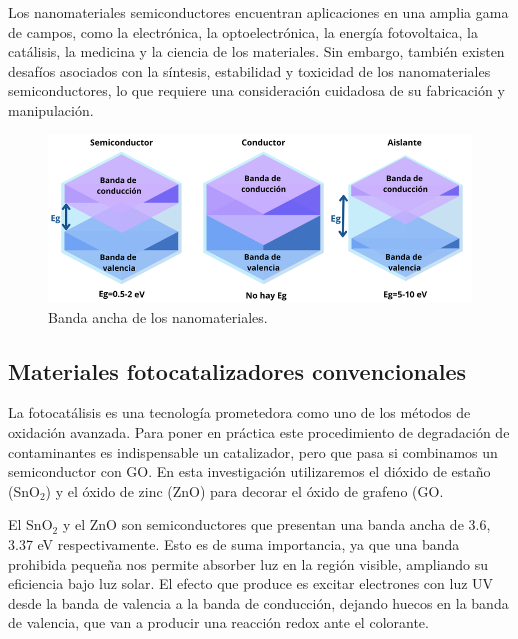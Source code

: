 \documentclass[12pt]{article}
\begin{document}
    Los nanomateriales semiconductores encuentran aplicaciones en una amplia gama de campos, como la electrónica, la optoelectrónica, la energía fotovoltaica, la catálisis, la medicina y la ciencia de los materiales. Sin embargo, también existen desafíos asociados con la síntesis, estabilidad y toxicidad de los nanomateriales semiconductores, lo que requiere una consideración cuidadosa de su fabricación y manipulación.
\begin{figure}[H]
    	   \begin{center}
     	  	\includegraphics[width = 1\textwidth]{Imagenes/SeminCondAisl.png}
     	  	\caption{Banda ancha de los nanomateriales. }\label{fig:SeminCondAisl}  
    	   \end{center} 
        \end{figure}

    \subsection{Materiales fotocatalizadores convencionales}
    La fotocatálisis es una tecnología prometedora como uno de los métodos de oxidación avanzada. Para poner en práctica este procedimiento de degradación de contaminantes es indispensable un catalizador, pero que pasa si combinamos un semiconductor con GO. En esta investigación utilizaremos el dióxido de estaño (SnO$\displaystyle _{2}$) y el óxido de zinc (ZnO) para decorar el óxido de grafeno (GO. \vspace{1em} %
    
    El SnO$\displaystyle _{2}$  y el ZnO son semiconductores que presentan una banda ancha de 3.6, 3.37 eV respectivamente. Esto es de suma importancia, ya que una banda prohibida pequeña nos permite absorber luz en la región visible, ampliando su eficiencia bajo luz solar. El efecto que produce es excitar electrones con luz UV desde la banda de valencia a la banda de conducción, dejando huecos en la banda de valencia, que van a producir una reacción redox ante el colorante.\vspace{1em} %
\end{document}
